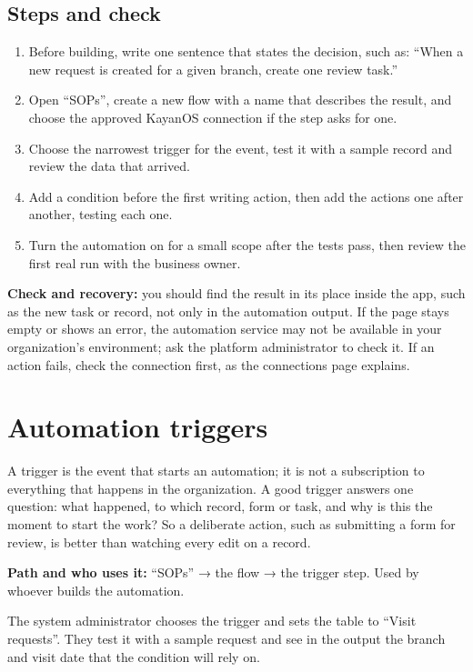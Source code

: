 \subsection{Steps and check}
\begin{enumerate}
\item Before building, write one sentence that states the decision, such as: “When a new request is created for a given branch, create one review task.”
\item Open “SOPs”, create a new flow with a name that describes the result, and choose the approved KayanOS connection if the step asks for one.
\item Choose the narrowest trigger for the event, test it with a sample record and review the data that arrived.
\item Add a condition before the first writing action, then add the actions one after another, testing each one.
\item Turn the automation on for a small scope after the tests pass, then review the first real run with the business owner.
\end{enumerate}

\textbf{Check and recovery:} you should find the result in its place inside the app, such as the new task or record, not only in the automation output. If the page stays empty or shows an error, the automation service may not be available in your organization's environment; ask the platform administrator to check it. If an action fails, check the connection first, as the connections page explains.

\clearpage
\section{Automation triggers}
\label{sec:builder-feature-sops-triggers}

A trigger is the event that starts an automation; it is not a subscription to everything that happens in the organization. A good trigger answers one question: what happened, to which record, form or task, and why is this the moment to start the work? So a deliberate action, such as submitting a form for review, is better than watching every edit on a record.

\textbf{Path and who uses it:} “SOPs” → the flow → the trigger step. Used by whoever builds the automation.

\begin{rcnote}
The system administrator chooses the  trigger and sets the table to “Visit requests”. They test it with a sample request and see in the output the branch and visit date that the condition will rely on.
\end{rcnote}

